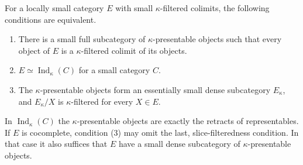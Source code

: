 \begin{theorem}\label{cat:I1}
For a locally small category $E$ with small $\kappa$-filtered colimits,
the following conditions are equivalent.
\begin{enumerate}
\item There is a small full subcategory of $\kappa$-presentable objects
such that every object of $E$ is a $\kappa$-filtered colimit of its objects.
\item $E\simeq\operatorname{Ind}_\kappa(C)$ for a small category $C$.
\item The $\kappa$-presentable objects form an essentially small dense
subcategory $E_\kappa$, and $E_\kappa/X$ is $\kappa$-filtered for every
$X\in E$.
\end{enumerate}
In $\operatorname{Ind}_\kappa(C)$ the $\kappa$-presentable objects are
exactly the retracts of representables.  If $E$ is cocomplete, condition
(3) may omit the last, slice-filteredness condition.  In that case it
also suffices that $E$ have a small dense subcategory of
$\kappa$-presentable objects.
\end{theorem}
